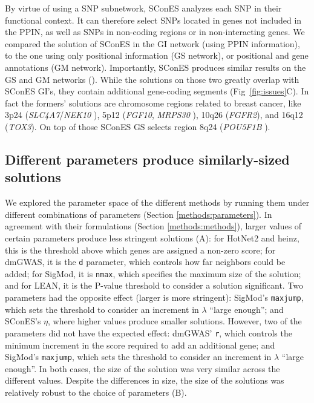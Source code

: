 \documentclass[10pt,letterpaper]{article}
\begin{document}
By virtue of using a SNP subnetwork, SConES analyzes each SNP in their functional context. It can therefore select SNPs located in genes not included in the PPIN, as well as SNPs in non-coding regions or in non-interacting genes. We compared the solution of SConES in the GI network (using PPIN information), to the one using only positional information (GS network), or positional and gene annotations (GM network). Importantly, SConES produces similar results on the GS and GM networks (). While the solutions on those two greatly overlap with SConES GI's, they contain additional gene-coding segments (Fig~\ref{fig:issues}C). In fact the formers' solutions are chromosome regions related to breast cancer, like 3p24 (\emph{SLC4A7}/\emph{NEK10} \cite{ahmed_newly_2009}), 5p12 (\emph{FGF10}, \emph{MRPS30} \cite{quigley_5p12_2014}), 10q26 (\emph{FGFR2}), and 16q12 (\emph{TOX3}). On top of those SConES GS selects region 8q24 (\emph{POU5F1B} \cite{breyer_expressed_2014}). 

\subsection{Different parameters produce similarly-sized solutions}
\label{results:parameters}

We explored the parameter space of the different methods by running them under different combinations of parameters (Section \ref{methods:parameters}). In agreement with their formulations (Section \ref{methods:methods}), larger values of certain parameters produce less stringent solutions (A): for HotNet2 and heinz, this is the threshold above which genes are assigned a non-zero score; for dmGWAS, it is the \texttt{d} parameter, which controls how far neighbors could be added; %
for SigMod, it is \texttt{nmax}, which specifies the maximum size of the solution; and for LEAN, it is the P-value threshold to consider a solution significant. Two parameters had the opposite effect (larger is more stringent): SigMod's \texttt{maxjump}, which sets the threshold to consider an increment in $\lambda$ ``large enough''; and SConES's $\eta$, where higher values produce smaller solutions. However, two of the parameters did not have the expected effect: dmGWAS' \texttt{r}, which controls the minimum increment in the score required to add an additional gene; and SigMod's \texttt{maxjump}, which sets the threshold to consider an increment in $\lambda$ ``large enough''. In both cases, the size of the solution was very similar across the different values. Despite the differences in size, the size of the solutions was relatively robust to the choice of parameters (B).
\end{document}
